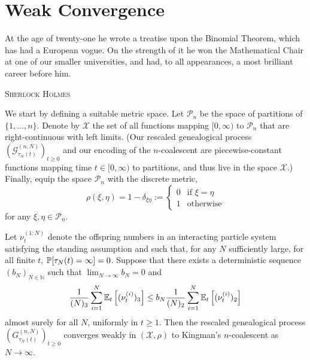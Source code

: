 \chapter{Weak Convergence \seb{$\checkmark$} }

\epigraph{
At the age of twenty-one he wrote a treatise upon the Binomial Theorem, which has had a European vogue. On the strength of it he won the Mathematical Chair at one of our smaller universities, and had, to all appearances, a most brilliant career before him.
}
{\textsc{Sherlock Holmes}} %


We start by defining a suitable metric space.
Let $\mathcal{P}_n$ be the space of partitions of $\{1,\dots,n\}$.
Denote by $\mathcal{X}$ the set of all functions mapping $[0,\infty)$ to $\mathcal{P}_n$ that are right-continuous with left limits.
(Our rescaled genealogical process $(\mathcal{G}^{(n,N)}_{\tau_N(t)})_{t\geq0}$ and our encoding of the $n$-coalescent are piecewise-constant functions mapping time $t\in[0,\infty)$ to partitions, and thus live in the space $\mathcal{X}$.)
Finally, equip the space $\mathcal{P}_n$ with the discrete metric,
\begin{equation*}
\rho(\xi,\eta) 
= 1- \delta_{\xi\eta} 
:= \begin{cases}
    0 &\text{if } \xi=\eta \\
    1 &\text{otherwise}
\end{cases}
\end{equation*}
for any $\xi, \eta \in \mathcal{P}_n$.


\begin{theorem}\label{thm:weakconv}
Let $\nu_t^{(1:N)}$ denote the offspring numbers in an interacting particle system satisfying the standing assumption and such that, for any $N$ sufficiently large, for all finite $t$, $\mathbb{P}[ \tau_N(t) = \infty ] =0$. Suppose that there exists a deterministic sequence $(b_N)_{N\in\mathbb{N}}$ such that ${\lim}_{N\to\infty} b_N =0$ and%
\begin{equation}\label{eq:mainthmcondition2}
\frac{1}{(N)_3} \sum_{i = 1}^N \mathbb{E}_t\left[ (\nu_t^{(i)})_3 \right]  \leq b_N \frac{1}{(N)_2} \sum_{i = 1}^N \mathbb{E}_t\left[ (\nu_t^{(i)})_2 \right]
\end{equation}
almost surely for all $N$, uniformly in $t \geq 1$.
Then the rescaled genealogical process $(G_{\tau_N(t)}^{(n,N)})_{t\geq0}$ converges weakly in $(\mathcal{X}, \rho)$
to Kingman's $n$-coalescent as $N \to \infty$.
\end{theorem}

